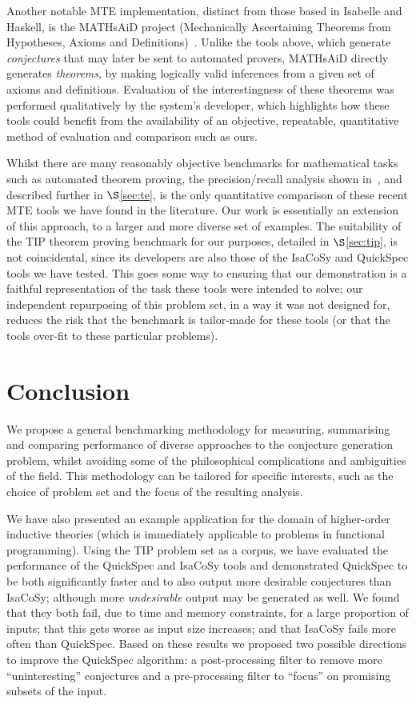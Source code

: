 Another notable MTE implementation, distinct from those based in Isabelle and
Haskell, is the MATHsAiD project (Mechanically Ascertaining Theorems from
Hypotheses, Axioms and Definitions)~\cite{roy}. Unlike the tools above, which
generate \emph{conjectures} that may later be sent to automated provers,
MATHsAiD directly generates \emph{theorems}, by making logically valid
inferences from a given set of axioms and definitions. Evaluation of the
interestingness of these theorems was performed qualitatively by the system's
developer, which highlights how these tools could benefit from the availability
of an objective, repeatable, quantitative method of evaluation and comparison
such as ours.

Whilst there are many reasonably objective benchmarks for mathematical tasks
such as automated theorem proving, the precision/recall analysis shown
in~\cite{claessen2013automating}, and described further in $\S$\ref{sec:te}, is
the only quantitative comparison of these recent MTE tools we have found in the
literature. Our work is essentially an extension of this approach, to a larger
and more diverse set of examples. The suitability of the TIP theorem proving
benchmark for our purposes, detailed in $\S$\ref{sec:tip}, is not coincidental,
since its developers are also those of the IsaCoSy and QuickSpec tools we have
tested. This goes some way to ensuring that our demonstration is a faithful
representation of the task these tools were intended to solve; our independent
repurposing of this problem set, in a way it was not designed for, reduces the
risk that the benchmark is tailor-made for these tools (or that the tools
over-fit to these particular problems).

\section{Conclusion}
\label{sec:conclusion}

We propose a general benchmarking methodology for measuring, summarising and
comparing performance of diverse approaches to the conjecture generation
problem, whilst avoiding some of the philosophical complications and ambiguities
of the field. This methodology can be tailored for specific interests, such as
the choice of problem set and the focus of the resulting analysis.

We have also presented an example application for the domain of higher-order
inductive theories (which is immediately applicable to problems in functional
programming). Using the TIP problem set as a corpus, we have evaluated the
performance of the QuickSpec and IsaCoSy tools and demonstrated QuickSpec to be
both significantly faster and to also output more desirable conjectures than
IsaCoSy; although more \emph{undesirable} output may be generated as well. We
found that they both fail, due to time and memory constraints, for a large
proportion of inputs; that this gets worse as input size increases; and that
IsaCoSy fails more often than QuickSpec. Based on these results we proposed two
possible directions to improve the QuickSpec algorithm: a post-processing filter
to remove more ``uninteresting'' conjectures and a pre-processing filter to
``focus'' on promising subsets of the input.

